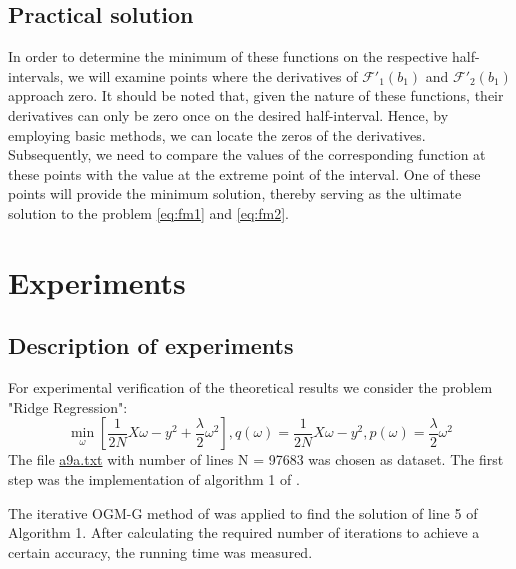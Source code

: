\documentclass{article}
\begin{document}
\subsection{Practical solution}\label{eq:3.5}
In order to determine the minimum of these functions on the respective half-intervals, we will examine points where the derivatives of $\mathcal{F'}_1(b_1)$ and $\mathcal{F'}_2(b_1)$ approach zero. It should be noted that, given the nature of these functions, their derivatives can only be zero once on the desired half-interval. Hence, by employing basic methods, we can locate the zeros of the derivatives. Subsequently, we need to compare the values of the corresponding function at these points with the value at the extreme point of the interval. One of these points will provide the minimum solution, thereby serving as the ultimate solution to the problem \ref{eq:fm1} and \ref{eq:fm2}.

\section{Experiments}

\subsection{Description of experiments}
For experimental verification of the theoretical results we consider the problem "Ridge Regression": 
\begin{equation}
    \label{ridge}
    \underset{\omega}{\min}[ \frac{1}{2N} X\omega - y^2 + \frac{\lambda}{2}\omega^2], q(\omega) = \frac{1}{2N} X\omega - y^2, p(\omega) = \frac{\lambda}{2}\omega^2
\end{equation}
The file \href{https://www.csie.ntu.edu.tw/~cjlin/libsvmtools/datasets/binary.html#a1a}{a9a.txt} with number of lines N = 97683 was chosen as dataset. The first step was the implementation of algorithm 1 of \cite{kovalev2022optimal}. 

The iterative OGM-G method of \cite{kim2021optimizing} was applied to find the solution of line 5 of Algorithm 1. After calculating the required number of iterations to achieve a certain accuracy, the running time was measured.
\end{document}
